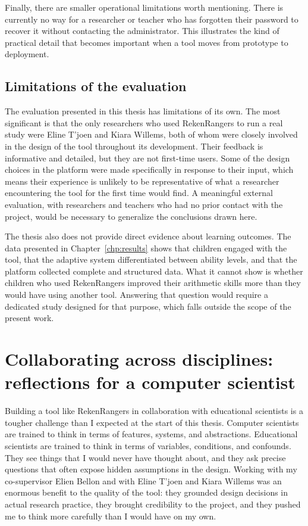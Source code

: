 Finally, there are smaller operational limitations worth mentioning. There is currently no way for a researcher or teacher who has forgotten their password to recover it without contacting the administrator. This illustrates the kind of practical detail that becomes important when a tool moves from prototype to deployment.

\subsection{Limitations of the evaluation}
The evaluation presented in this thesis has limitations of its own. The most significant is that the only researchers who used RekenRangers to run a real study were Eline T'joen and Kiara Willems, both of whom were closely involved in the design of the tool throughout its development. Their feedback is informative and detailed, but they are not first-time users. Some of the design choices in the platform were made specifically in response to their input, which means their experience is unlikely to be representative of what a researcher encountering the tool for the first time would find. A meaningful external evaluation, with researchers and teachers who had no prior contact with the project, would be necessary to generalize the conclusions drawn here.

The thesis also does not provide direct evidence about learning outcomes. The data presented in Chapter~\ref{chp:results} shows that children engaged with the tool, that the adaptive system differentiated between ability levels, and that the platform collected complete and structured data. What it cannot show is whether children who used RekenRangers improved their arithmetic skills more than they would have using another tool. Answering that question would require a dedicated study designed for that purpose, which falls outside the scope of the present work.

\section{Collaborating across disciplines: reflections for a computer scientist}
Building a tool like RekenRangers in collaboration with educational scientists is a tougher challenge than I expected at the start of this thesis. Computer scientists are trained to think in terms of features, systems, and abstractions. Educational scientists are trained to think in terms of variables, conditions, and confounds. They see things that I would never have thought about, and they ask precise questions that often expose hidden assumptions in the design. Working with my co-supervisor Elien Bellon and with Eline T'joen and Kiara Willems was an enormous benefit to the quality of the tool: they grounded design decisions in actual research practice, they brought credibility to the project, and they pushed me to think more carefully than I would have on my own.

